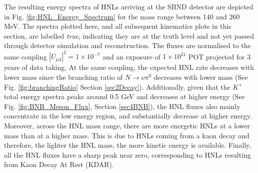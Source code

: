 %

The resulting energy spectra of HNLs arriving at the SBND detector are depicted in Fig. \ref{fig:HNL_Energy_Spectrum} for the mass range between 140 and 260 MeV.
The spectra plotted here, and all subsequent kinematics plots in this section, are labelled \textit{true}, indicating they are at the truth level and not yet passed through detector simulation and reconstruction.
The fluxes are normalised to the same coupling $|U_{\mu4}|^{2} = 1 \times 10^{-7}$ and an exposure of $1 \times 10^{21}$ POT projected for 3 years of data taking.
At the same coupling, the expected HNL rate decreases with lower mass since the branching ratio of $N \rightarrow \nu\pi^0$ decreases with lower mass (See Fig. \ref{fig:branchingRatio} Section \ref{sec2Decay}).
Additionally, given that the $K^{+}$ total energy spectra peaks around 0.5 GeV and decreases at higher energy (See Fig. \ref{fig:BNB_Meson_Flux}, Section \ref{sec4BNB}), the HNL fluxes also mainly concentrate in the low energy region, and substantially decrease at higher energy. 
Moreover, across the HNL mass range, there are more energetic HNLs at a lower mass than at a higher mass.
This is due to HNLs coming from a kaon decay and therefore, the lighter the HNL mass, the more kinetic energy is available.
Finally, all the HNL fluxes have a sharp peak near zero, corresponding to HNLs resulting from Kaon Decay At Rest (KDAR).

